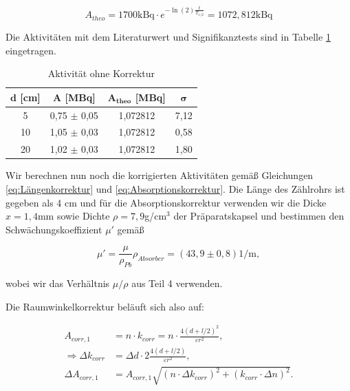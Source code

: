 \documentclass{article}
\begin{document}
\begin{equation}
    A_{theo} = 1700 \text{kBq} \cdot e^{- \ln{(2)} \frac{t}{T_{1/2}}} = 1072,812 \text{kBq}
\end{equation}

Die Aktivitäten mit dem Literaturwert und Signifikanztests sind in Tabelle \ref{tab:A5-ohneKorr} eingetragen.

\begin{table}[!h]
    \centering
    \begin{tabular}{cccc}
        \hline
        $\bm{d}$ [cm] & $\bm{A}$ [MBq] & $\bm{A_{theo}}$ [MBq] & $\bm{\sigma}$  \\ \hline
         5  & 0,75 $\pm$ 0,05 & 1,072812 & 7,12 \\
         10 & 1,05 $\pm$ 0,03 & 1,072812 & 0,58 \\
         20 & 1,02 $\pm$ 0,03 & 1,072812 & 1,80 \\ \hline
    \end{tabular}%
    \caption{Aktivität ohne Korrektur}
    \label{tab:A5-ohneKorr}
\end{table}

Wir berechnen nun noch die korrigierten Aktivitäten gemäß Gleichungen \ref{eq:Längenkorrektur} und \ref{eq:Absorptionskorrektur}. Die Länge des Zählrohrs ist gegeben als 4 cm und für die Absorptionskorrektur verwenden wir die Dicke $x = 1,4$mm sowie Dichte $\rho = 7,9$g/cm$^3$ der Präparatskapsel und bestimmen den Schwächungskoeffizient $\mu'$ gemäß

\begin{equation}
    \mu' = \frac{\mu}{\rho_{Pb}} \rho_{Absorber} = (43,9 \pm 0,8) \text{1/m},
\end{equation}

wobei wir das Verhältnis $\mu / \rho$ aus Teil 4 verwenden. 

Die Raumwinkelkorrektur beläuft sich also auf:

\begin{equation}
    \begin{split}
        A_{corr,1} &= n \cdot k_{corr} = n \cdot \frac{4 (d+l/2)^2}{\varepsilon r^2}, \\
        \Rightarrow \Delta k_{corr} &= \Delta d \cdot 2 \frac{4 (d+l/2)}{\varepsilon r^2}, \\
        \Delta A_{corr,1} &= A_{corr,1} \sqrt{(n \cdot \Delta k_{corr})^2 + (k_{corr} \cdot \Delta n)^2}.
    \end{split}
\end{equation}
\end{document}
